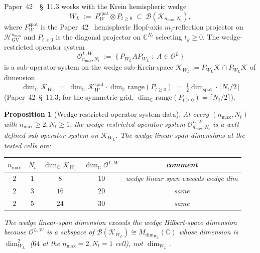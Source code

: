 \documentclass[11pt,a4paper]{article}
\theoremstyle{plain}
\newtheorem{proposition}[theorem]{Proposition}
\theoremstyle{definition}
\newcommand{\nmax}{n_{\max}}
\newcommand{\Nt}{N_t}
\newcommand{\Krein}{\mathcal{K}}
\newcommand{\Op}{\mathcal{O}}
\newcommand{\Bcal}{\mathcal{B}}
\newcommand{\C}{\mathbb{C}}
\newcommand{\Mat}{M}
\newcommand{\HGV}{\mathcal{H}_{\mathrm{GV}}}
\newcommand{\spat}{\mathrm{spat}}
\begin{document}
Paper~42~\cite{paper42}~\S~11.3 works with the Krein hemispheric wedge
\begin{equation}\label{eq:W_L_def}
   W_L \;:=\; P_W^{\spat} \otimes P_{t \ge 0}
   \;\subset\; \Bcal(\Krein_{\nmax, \Nt}),
\end{equation}
where $P_W^{\spat}$ is the Paper~42~\cite{paper42} hemispheric
Hopf-axis $m_j$-reflection projector on $\HGV^{\nmax}$ and
$P_{t \ge 0}$ is the diagonal projector on $\C^{\Nt}$ selecting
$t_k \ge 0$. The wedge-restricted operator system
\begin{equation}\label{eq:O_L_wedge}
   \Op_{\nmax, \Nt}^{L, W} \;:=\; \{\, P_{W_L} A P_{W_L}
                                     \;:\; A \in \Op^L \,\}
\end{equation}
is a sub-operator-system on the wedge sub-Krein-space
$\Krein_{W_L} := P_{W_L} \Krein \cap P_{W_L} \Krein$ of dimension
\begin{equation}\label{eq:dim_wedge}
   \dim_\C \Krein_{W_L}
   \;=\; \dim_\C \Krein_W^{\spat} \cdot \dim_\C \mathrm{range}(P_{t \ge 0})
   \;=\; \tfrac{1}{2} \dim_\spat \cdot \lceil \Nt / 2 \rceil
\end{equation}
(Paper~42~\S~11.3; for the symmetric grid, $\dim_\C \mathrm{range}(P_{t
\ge 0}) = \lceil \Nt / 2 \rceil$).

\begin{proposition}[Wedge-restricted operator-system data]
\label{prop:wedge_restriction}
At every $(\nmax, \Nt)$ with $\nmax \ge 2, \Nt \ge 1$, the
wedge-restricted operator system
$\Op_{\nmax, \Nt}^{L, W}$ is a well-defined sub-operator-system on
$\Krein_{W_L}$. The wedge linear-span dimensions at the tested cells
are:

\medskip
\begin{center}\renewcommand{\arraystretch}{1.20}
\begin{tabular}{c|c|c|c|c}
$\nmax$ & $\Nt$ & $\dim_\C \Krein_{W_L}$
   & $\dim_\C \Op^{L,W}$ & comment \\
\hline
$2$ & $1$ & $8$  & $10$  & wedge linear span exceeds wedge dim \\
$2$ & $3$ & $16$ & $20$  & same \\
$2$ & $5$ & $24$ & $30$  & same \\
\end{tabular}
\end{center}
\medskip

The wedge linear-span dimension exceeds the wedge Hilbert-space
dimension because $\Op^{L,W}$ is a subspace of
$\Bcal(\Krein_{W_L}) \cong \Mat_{\dim_{W_L}}(\C)$ whose dimension is
$\dim_{W_L}^2$ ($64$ at the $\nmax = 2, \Nt = 1$ cell), not
$\dim_{W_L}$.
\end{proposition}
\end{document}
